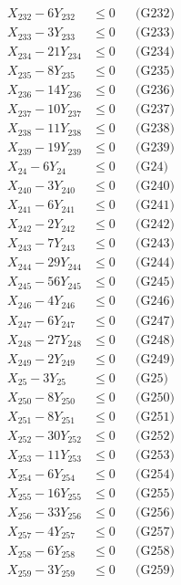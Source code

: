 \documentclass[a4paper,10pt]{article}
\begin{document}
{\begin{align}
X_{232} - 6Y_{232} &\leq 0 && \text{(G232)} \\
X_{233} - 3Y_{233} &\leq 0 && \text{(G233)} \\
X_{234} - 21Y_{234} &\leq 0 && \text{(G234)} \\
X_{235} - 8Y_{235} &\leq 0 && \text{(G235)} \\
X_{236} - 14Y_{236} &\leq 0 && \text{(G236)} \\
X_{237} - 10Y_{237} &\leq 0 && \text{(G237)} \\
X_{238} - 11Y_{238} &\leq 0 && \text{(G238)} \\
X_{239} - 19Y_{239} &\leq 0 && \text{(G239)} \\
X_{24} - 6Y_{24} &\leq 0 && \text{(G24)} \\
X_{240} - 3Y_{240} &\leq 0 && \text{(G240)} \\
X_{241} - 6Y_{241} &\leq 0 && \text{(G241)} \\
\allowbreak
X_{242} - 2Y_{242} &\leq 0 && \text{(G242)} \\
X_{243} - 7Y_{243} &\leq 0 && \text{(G243)} \\
X_{244} - 29Y_{244} &\leq 0 && \text{(G244)} \\
X_{245} - 56Y_{245} &\leq 0 && \text{(G245)} \\
X_{246} - 4Y_{246} &\leq 0 && \text{(G246)} \\
X_{247} - 6Y_{247} &\leq 0 && \text{(G247)} \\
X_{248} - 27Y_{248} &\leq 0 && \text{(G248)} \\
X_{249} - 2Y_{249} &\leq 0 && \text{(G249)} \\
X_{25} - 3Y_{25} &\leq 0 && \text{(G25)} \\
X_{250} - 8Y_{250} &\leq 0 && \text{(G250)} \\
X_{251} - 8Y_{251} &\leq 0 && \text{(G251)} \\
X_{252} - 30Y_{252} &\leq 0 && \text{(G252)} \\
X_{253} - 11Y_{253} &\leq 0 && \text{(G253)} \\
X_{254} - 6Y_{254} &\leq 0 && \text{(G254)} \\
X_{255} - 16Y_{255} &\leq 0 && \text{(G255)} \\
X_{256} - 33Y_{256} &\leq 0 && \text{(G256)} \\
X_{257} - 4Y_{257} &\leq 0 && \text{(G257)} \\
X_{258} - 6Y_{258} &\leq 0 && \text{(G258)} \\
X_{259} - 3Y_{259} &\leq 0 && \text{(G259)} \\

\end{align}}
\end{document}
